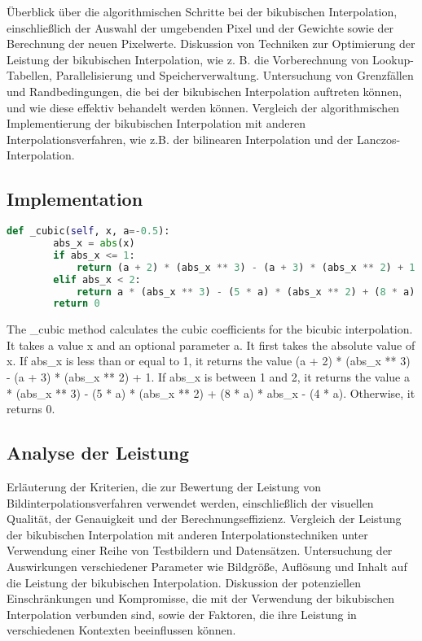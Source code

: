     Überblick über die algorithmischen Schritte bei der bikubischen Interpolation, einschließlich der Auswahl der umgebenden Pixel und der Gewichte sowie der Berechnung der neuen Pixelwerte.
    Diskussion von Techniken zur Optimierung der Leistung der bikubischen Interpolation, wie z. B. die Vorberechnung von Lookup-Tabellen, Parallelisierung und Speicherverwaltung.
    Untersuchung von Grenzfällen und Randbedingungen, die bei der bikubischen Interpolation auftreten können, und wie diese effektiv behandelt werden können.
    Vergleich der algorithmischen Implementierung der bikubischen Interpolation mit anderen Interpolationsverfahren, wie z.B. der bilinearen Interpolation und der Lanczos-Interpolation.

    \subsection{Implementation}
    \begin{lstlisting}[language=python,
                   frame=single,           % Ein Rahmen um den Code
                   framexleftmargin=15pt,  % Rahmen link von den Zahlen
                   style=algoBericht,
                   label={algo-quicksort},
                   captionpos=b,           % Caption unter den Code setzen
		   caption={quicksort in C}]
    def _cubic(self, x, a=-0.5):
        abs_x = abs(x)
        if abs_x <= 1:
            return (a + 2) * (abs_x ** 3) - (a + 3) * (abs_x ** 2) + 1
        elif abs_x < 2:
            return a * (abs_x ** 3) - (5 * a) * (abs_x ** 2) + (8 * a) * abs_x - (4 * a)
        return 0
\end{lstlisting}

The \_cubic method calculates the cubic coefficients for the bicubic interpolation. It takes a value x and an optional parameter a. It first takes the absolute value of x. If abs\_x is less than or equal to 1, it returns the value (a + 2) * (abs\_x ** 3) - (a + 3) * (abs\_x ** 2) + 1. If abs\_x is between 1 and 2, it returns the value a * (abs\_x ** 3) - (5 * a) * (abs\_x ** 2) + (8 * a) * abs\_x - (4 * a). Otherwise, it returns 0.
    

    \subsection{Analyse der Leistung}

    Erläuterung der Kriterien, die zur Bewertung der Leistung von Bildinterpolationsverfahren verwendet werden, einschließlich der visuellen Qualität, der Genauigkeit und der Berechnungseffizienz.
    Vergleich der Leistung der bikubischen Interpolation mit anderen Interpolationstechniken unter Verwendung einer Reihe von Testbildern und Datensätzen.
    Untersuchung der Auswirkungen verschiedener Parameter wie Bildgröße, Auflösung und Inhalt auf die Leistung der bikubischen Interpolation.
    Diskussion der potenziellen Einschränkungen und Kompromisse, die mit der Verwendung der bikubischen Interpolation verbunden sind, sowie der Faktoren, die ihre Leistung in verschiedenen Kontexten beeinflussen können.

